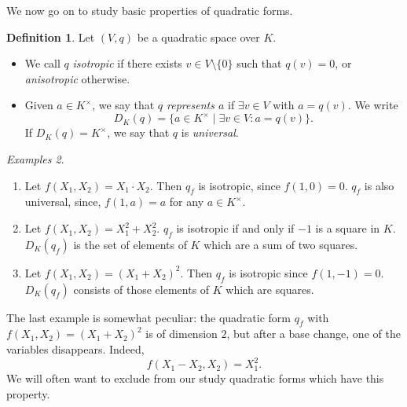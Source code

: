 \documentclass[12pt, leqno, british]{amsart}
\theoremstyle{definition}
\newtheorem{defi}{Definition}[subsection]
\theoremstyle{plain}
\theoremstyle{remark}
\newtheorem{egs}[defi]{Examples}
\begin{document}
We now go on to study basic properties of quadratic forms.
\begin{defi}\label{D:isotropic-represents-universal}
Let $(V, q)$ be a quadratic space over $K$.
\begin{itemize}
\item We call $q$ \emph{isotropic} if there exists $v \in V \setminus \lbrace 0 \rbrace$ such that $q(v) = 0$, or \emph{anisotropic} otherwise.
\item Given $a \in K^\times$, we say that \emph{$q$ represents $a$} if $\exists v \in V$ with $a = q(v)$.
We write
$$ D_K(q) = \lbrace a \in K^\times \mid \exists v \in V : a = q(v) \rbrace.$$
If $D_K(q) = K^\times$, we say that $q$ is \emph{universal}.
\end{itemize}
\end{defi}
\begin{egs}\label{E:hyp} \
\begin{enumerate}
\item Let $f(X_1, X_2) = X_1 \cdot X_2$. Then $q_f$ is isotropic, since $f(1, 0) = 0$.
$q_f$ is also universal, since, $f(1, a) = a$ for any $a \in K^\times$.
\item Let $f(X_1, X_2) = X_1^2 + X_2^2$.
$q_f$ is isotropic if and only if $-1$ is a square in $K$. $D_K(q_f)$ is the set of elements of $K$ which are a sum of two squares.
\item Let $f(X_1, X_2) = (X_1 + X_2)^2$. Then $q_f$ is isotropic since $f(1, -1) = 0$.
$D_K(q_f)$ consists of those elements of $K$ which are squares.
\end{enumerate}
\end{egs}
The last example is somewhat peculiar: the quadratic form $q_f$ with $f(X_1, X_2) = (X_1 + X_2)^2$ is of dimension $2$, but after a base change, one of the variables disappears. Indeed,
$$ f\left(X_1 - X_2, X_2\right) = X_1^2.$$
We will often want to exclude from our study quadratic forms which have this property.
\end{document}
